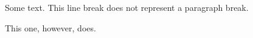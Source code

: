 \documentclass{report}
\begin{document}
Some text. This line
break does not represent a paragraph break.

This one, however, does.
\end{document}
